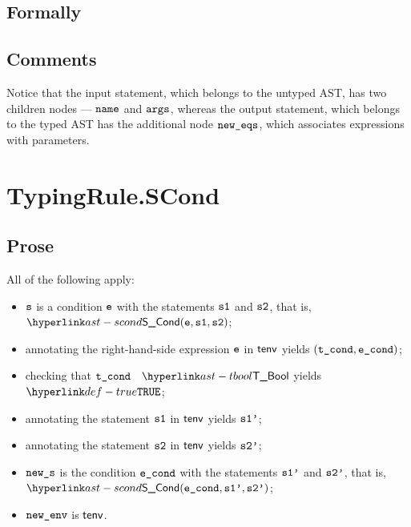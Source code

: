 
\subsection{Formally}
\begin{mathpar}
\end{mathpar}

\subsection{Comments}
Notice that the input statement, which belongs to the untyped AST, has two children nodes ---
$\name$ and $\vargs$, whereas the output statement, which belongs to the typed AST has the additional
node $\neweqs$, which associates expressions with parameters.


\section{TypingRule.SCond \label{sec:TypingRule.SCond}}

\subsection{Prose}
All of the following apply:
\begin{itemize}
  \item $\vs$ is a condition $\ve$ with the statements $\vsone$ and $\vstwo$, that is, $\SCond(\ve, \vsone, \vstwo)$;
  \item annotating the right-hand-side expression $\ve$ in $\tenv$ yields $(\tcond, \econd)$\ProseOrTypeError;
  \item checking that $\tcond$ \typesatisfies\ $\TBool$ yields $\True$\ProseOrTypeError;
  \item annotating the statement $\vsone$ in $\tenv$ yields $\vsonep$\ProseOrTypeError;
  \item annotating the statement $\vstwo$ in $\tenv$ yields $\vstwop$\ProseOrTypeError;
  \item $\news$ is the condition $\econd$ with the statements $\vsonep$ and $\vstwop$, that is, \\ $\SCond(\econd, \vsonep, \vstwop)$;
  \item $\newenv$ is $\tenv$.
\end{itemize}

